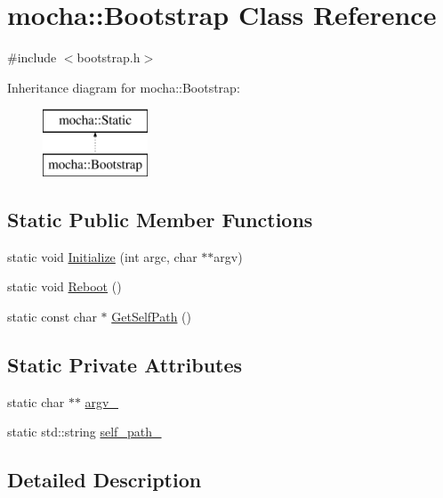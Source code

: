 \hypertarget{classmocha_1_1_bootstrap}{
\section{mocha::Bootstrap Class Reference}
\label{classmocha_1_1_bootstrap}
}


{\ttfamily \#include $<$bootstrap.h$>$}

Inheritance diagram for mocha::Bootstrap:\begin{figure}[H]
\begin{center}
\leavevmode
\includegraphics[height=2.000000cm]{classmocha_1_1_bootstrap}
\end{center}
\end{figure}
\subsection*{Static Public Member Functions}
\begin{DoxyCompactItemize}
\item 
static void \hyperlink{classmocha_1_1_bootstrap_a5dee98ca5bf16b8dd98d75f51b8efff7}{Initialize} (int argc, char $\ast$$\ast$argv)
\item 
static void \hyperlink{classmocha_1_1_bootstrap_a608b95cd0ad4f95b5a255255a7d274f8}{Reboot} ()
\item 
static const char $\ast$ \hyperlink{classmocha_1_1_bootstrap_ac47223e05a7a800949bba15e41108079}{GetSelfPath} ()
\end{DoxyCompactItemize}
\subsection*{Static Private Attributes}
\begin{DoxyCompactItemize}
\item 
static char $\ast$$\ast$ \hyperlink{classmocha_1_1_bootstrap_a0e051d1dc99827f5a02b3fa464de14b3}{argv\_\-}
\item 
static std::string \hyperlink{classmocha_1_1_bootstrap_aef118b8931b53c8bca13e1cc5f5ba882}{self\_\-path\_\-}
\end{DoxyCompactItemize}


\subsection{Detailed Description}


